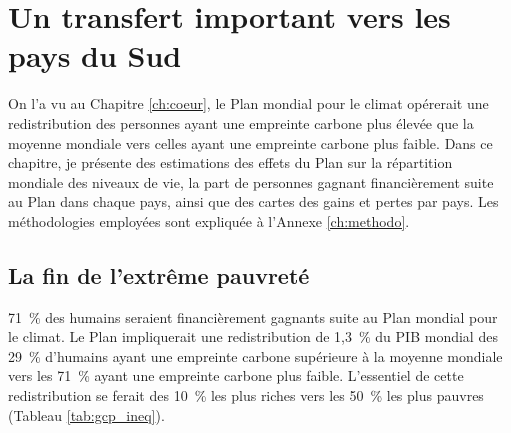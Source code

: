 \documentclass[a5paper,french,openany]{memoir}
\begin{document}



\chapter{Un transfert important vers les pays du Sud\label{ch:effets_distributifs}}

On l'a vu au Chapitre \ref{ch:coeur}, le Plan mondial pour le climat opérerait une redistribution des personnes ayant une empreinte carbone plus élevée que la moyenne mondiale vers celles ayant une empreinte carbone plus faible. Dans ce chapitre, je présente des estimations des effets du Plan sur la répartition mondiale des niveaux de vie, la part de personnes gagnant financièrement suite au Plan dans chaque pays, ainsi que des cartes des gains et pertes par pays. Les méthodologies employées sont expliquée à l'Annexe \ref{ch:methodo}.

\section{La fin de l'extrême pauvreté}\label{sec:fin_pauvrete}

71~\% des humains seraient financièrement gagnants suite au Plan mondial pour le climat. Le Plan impliquerait une redistribution de 1,3~\% du PIB mondial des 29~\% d'humains ayant une empreinte carbone supérieure à la moyenne mondiale vers les 71~\% ayant une empreinte carbone plus faible. L'essentiel %
de cette redistribution se ferait des 10~\% les plus riches vers les 50~\% les plus pauvres (Tableau \ref{tab:gcp_ineq}). 
\end{document}
